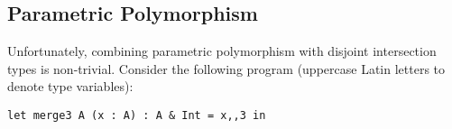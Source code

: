 \begin{comment}
\subsection{Top-like types}\bruno{You are spending too much time to
  get to the point. When writting a paper you want to get to the point
  (what's the problem) 
as fast as possible. So you should have enough background to understand
the paper, but keep that background minimal. Look at the ICFP paper: 
we got to Section 2.2 (the problem) in less than a column.
I think we don't need to
cover top-like types here. They are not essential. }
The \oldname calculus also showed how to extend the type system with a type $\top$, the supertype 
of all types.
Since introducing $\top$ leads to a useless disjointness specification (i.e. no type is disjoint to
any other type) and introduces some ambiguity because $\top \subtype \top \inter \top$ and
$\top \inter \top \subtype \top$.
Therefore, the specification was changed to the following:

\begin{definition}[$\top$-disjointness]
  Two types $A$ and $B$ are disjoint
  (written $A \disjoint B$) if the following two conditions are satisfied:
\begin{enumerate}
  \item $(\text{not}~\toplike{A})~\text{and}~(\text{not}~\toplike{B}) $
  \item $\forall C.~\text{if}~ A \subtype C~\text{and}~B \subtype C~\text{then}~\toplike{C}$
\end{enumerate}
\end{definition}
The unary relation $\toplike{\cdot}$ represents the so-called top-like types, which are types that resemble 
$\top$.
This set of types includes $\top$ itself, intersections composed of other 
top-like types (i.e. $\top \inter \top$), and pre-top-types, which are functions that have
$\top$ as their co-domain (i.e. $\tyint \to \tychar \to \top$).
\end{comment}

\subsection{Parametric Polymorphism}
Unfortunately, combining parametric polymorphism with disjoint
intersection types is non-trivial. Consider the following program
(uppercase Latin letters to denote type variables):

\begin{lstlisting}
let merge3 A (x : A) : A & Int = x,,3 in
\end{lstlisting}

